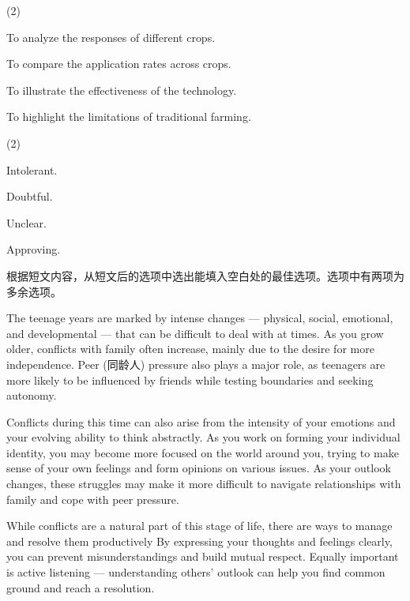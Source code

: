 \documentclass{英语试卷}
\begin{document}
\begin{choices}(2)
  \item To analyze the responses of different crops.
  \item To compare the application rates across crops.
  \item To illustrate the effectiveness of the technology.
  \item To highlight the limitations of traditional farming.
\end{choices}
\begin{choices}(2)
  \item Intolerant.
  \item Doubtful.
  \item Unclear.
  \item Approving.
\end{choices}
\par 根据短文内容，从短文后的选项中选出能填入空白处的最佳选项。选项中有两项为多余选项。\par
\par The teenage years are marked by intense changes — physical, social, emotional, and developmental — that can be difficult to deal with at times.  As you grow older, conflicts with family often increase, mainly due to the desire for more independence. Peer (同龄人) pressure also plays a major role, as teenagers are more likely to be influenced by friends while testing boundaries and seeking autonomy.\par
\par Conflicts during this time can also arise from the intensity of your emotions and your evolving ability to think abstractly. As you work on forming your individual identity, you may become more focused on the world around you, trying to make sense of your own feelings and form opinions on various issues.  As your outlook changes, these struggles may make it more difficult to navigate relationships with family and cope with peer pressure.\par
\par While conflicts are a natural part of this stage of life, there are ways to manage and resolve them productively  By expressing your thoughts and feelings clearly, you can prevent misunderstandings and build mutual respect. Equally important is active listening — understanding others' outlook can help you find common ground and reach a resolution.\par
\end{document}
